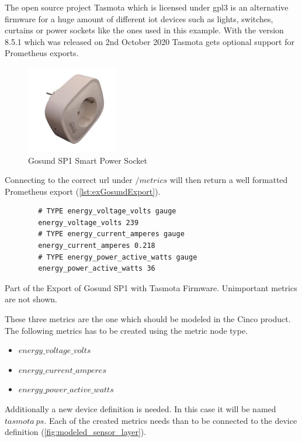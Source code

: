 The open source project Tasmota \cite{tasmotawebsite} which is licensed under \gls{gpl3} is an alternative firmware for a huge amount of different \gls{iot} devices such as lights, switches, curtains or power sockets like the ones used in this example.
With the version 8.5.1 which was released on 2nd October 2020 Tasmota gets optional support for Prometheus exports. 

\begin{figure}[!ht]
	\centering
	\includegraphics[width=4cm]{assets/images/gosund.png}
	\caption{Gosund SP1 Smart Power Socket}
	\label{fig:gosund_sp1}
\end{figure}

Connecting to the correct \gls{url} under $/metrics$ will then return a well formatted Prometheus export (\cref{lst:exGosundExport}).

\begin{listing}[!ht]
	\begin{verbatim}
		# TYPE energy_voltage_volts gauge
		energy_voltage_volts 239
		# TYPE energy_current_amperes gauge
		energy_current_amperes 0.218
		# TYPE energy_power_active_watts gauge
		energy_power_active_watts 36
	\end{verbatim}
	\caption{Part of the Export of Gosund SP1 with Tasmota Firmware. Unimportant metrics are not shown.}
	\label{lst:exGosundExport}
\end{listing}

These three metrics are the one which should be modeled in the Cinco product. The following metrics has to be created using the metric node type. 

\begin{itemize}
	\item $energy\_voltage\_volts$
	\item $energy\_current\_amperes$
	\item $energy\_power\_active\_watts$ 
\end{itemize}

Additionally a new device definition is needed. In this case it will be named $tasmota\ ps$. Each of the created metrics needs than to be connected to the device definition (\cref{fig:modeled_sensor_layer}).


